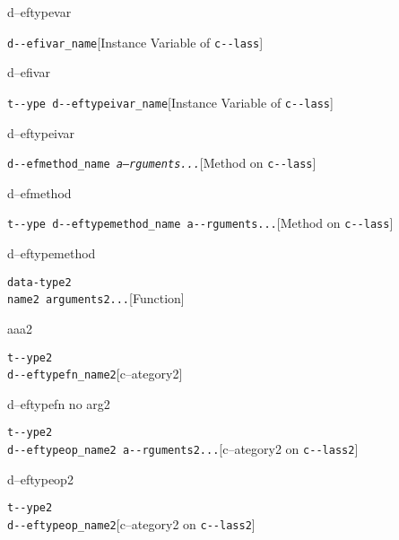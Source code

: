 \documentclass{book}
\begin{document}
\begin{titlepage}
%
d--eftypevar

\noindent\texttt{d{-}{-}efivar\_name}\hfill[Instance Variable of \texttt{c{-}{-}lass}]



%
d--efivar

\noindent\texttt{t{-}{-}ype d{-}{-}eftypeivar\_name}\hfill[Instance Variable of \texttt{c{-}{-}lass}]



%
d--eftypeivar

\noindent\texttt{d{-}{-}efmethod\_name \EmbracOn{}\textnormal{\textsl{a--rguments...}}\EmbracOff{}}\hfill[Method on \texttt{c{-}{-}lass}]



%
d--efmethod

\noindent\texttt{t{-}{-}ype d{-}{-}eftypemethod\_name a{-}{-}rguments...}\hfill[Method on \texttt{c{-}{-}lass}]



%
d--eftypemethod


\noindent\texttt{data-type2\leavevmode{}\\name2 arguments2...}\hfill[Function]



%
aaa2

\noindent\texttt{t{-}{-}ype2\leavevmode{}\\d{-}{-}eftypefn\_name2}\hfill[c--ategory2]



%
d--eftypefn no arg2

\noindent\texttt{t{-}{-}ype2\leavevmode{}\\d{-}{-}eftypeop\_name2 a{-}{-}rguments2...}\hfill[c--ategory2 on \texttt{c{-}{-}lass2}]



%
d--eftypeop2

\noindent\texttt{t{-}{-}ype2\leavevmode{}\\d{-}{-}eftypeop\_name2}\hfill[c--ategory2 on \texttt{c{-}{-}lass2}]




\end{titlepage}
\end{document}
